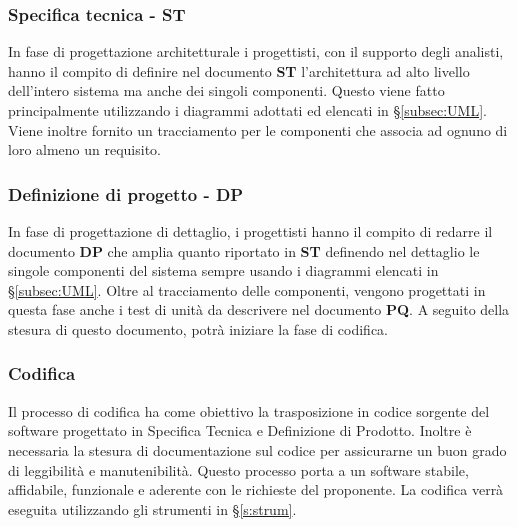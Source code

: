 \documentclass[a4paper,11pt]{article}
\begin{document}
		\subsubsection{Specifica tecnica - ST}
		In fase di progettazione architetturale i progettisti, con il supporto degli analisti, hanno il compito di definire nel documento \textbf{ST}  l'architettura ad alto livello dell'intero sistema ma anche dei singoli componenti. Questo viene fatto principalmente utilizzando i diagrammi adottati ed elencati in §\ref{subsec:UML}. Viene inoltre fornito un tracciamento per le componenti che associa ad ognuno di loro almeno un requisito. 
		\subsubsection{Definizione di progetto - DP}	
		In fase di progettazione di dettaglio, i progettisti hanno il compito di redarre il documento \textbf{DP} che amplia quanto riportato in \textbf{ST} definendo nel dettaglio le singole componenti del sistema sempre usando i diagrammi elencati in §\ref{subsec:UML}. Oltre al tracciamento delle componenti, vengono progettati in questa fase anche i test di unità da descrivere nel documento \textbf{PQ}. A seguito della stesura di questo documento, potrà iniziare la fase di codifica.
		\subsubsection{Codifica}
			Il processo di codifica ha come obiettivo la trasposizione in codice sorgente del software progettato in Specifica Tecnica e Definizione di Prodotto. Inoltre è necessaria la stesura di documentazione sul codice per assicurarne un buon grado di leggibilità e manutenibilità.
				Questo processo porta a un software stabile, affidabile, funzionale e aderente con le richieste del proponente. La codifica verrà eseguita utilizzando gli strumenti in §\ref{s:strum}. 
			
\end{document}
